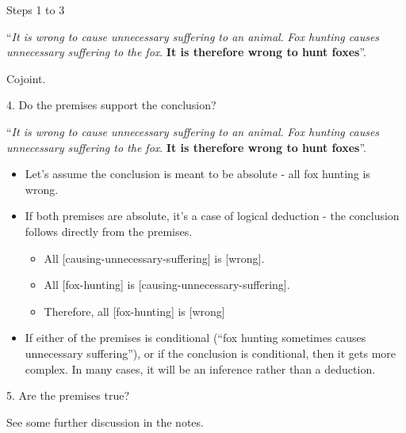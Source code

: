 \documentclass{beamer}
\begin{document}

\begin{frame}{Steps 1 to 3}

``\emph{It is wrong to cause unnecessary suffering to an animal}. \emph{Fox hunting causes unnecessary suffering to the fox}. \textbf{It is therefore wrong to hunt foxes}''.

\vspace{12pt}
Cojoint.

\end{frame}



\begin{frame}{4. Do the premises support the conclusion?}

``\emph{It is wrong to cause unnecessary suffering to an animal}. \emph{Fox hunting causes unnecessary suffering to the fox}. \textbf{It is therefore wrong to hunt foxes}''.

\begin{itemize}
	\item Let's assume the conclusion is meant to be absolute - all fox hunting is wrong.
	\item If both premises are absolute, it's a case of logical deduction - the conclusion follows directly from the premises.
	\begin{itemize}
		\item All [causing-unnecessary-suffering] is [wrong].
		\item All [fox-hunting] is [causing-unnecessary-suffering].
		\item Therefore, all [fox-hunting] is [wrong]
	\end{itemize}
	\item If either of the premises is conditional (``fox hunting sometimes causes unnecessary suffering''), or if the conclusion is conditional, then it gets more complex. In many cases, it will be an inference rather than a deduction. 
\end{itemize}
\end{frame}

\begin{frame}{5. Are the premises true?}

See some further discussion in the notes.
	
\end{frame}
\end{document}
